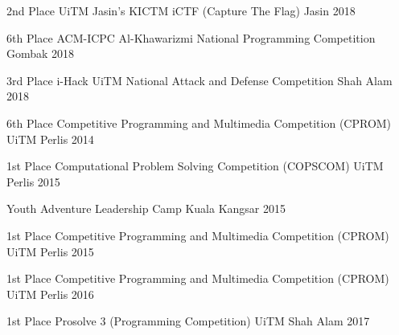\begin{cvhonors}
  \cvhonor
    {2nd Place}
    {UiTM Jasin's KICTM iCTF (Capture The Flag) }
    {Jasin}
    {2018}

  \cvhonor
    {6th Place}
    {ACM-ICPC Al-Khawarizmi National Programming Competition}
    {Gombak}
    {2018}

  \cvhonor
    {3rd Place}
    {i-Hack UiTM National Attack and Defense Competition}
    {Shah Alam}
    {2018}

\end{cvhonors}


\begin{cvhonors}

  \cvhonor
    {6th Place}
    {Competitive Programming and Multimedia Competition (CPROM)}
    {UiTM Perlis}
    {2014}

  \cvhonor
    {1st Place}
    {Computational Problem Solving Competition (COPSCOM)}
    {UiTM Perlis}
    {2015}

  \cvhonor
    {}
    {Youth Adventure Leadership Camp}
    {Kuala Kangsar}
    {2015}

  \cvhonor
    {1st Place}
    {Competitive Programming and Multimedia Competition (CPROM)}
    {UiTM Perlis}
    {2015}
        
  \cvhonor
    {1st Place}
    {Competitive Programming and Multimedia Competition (CPROM)}
    {UiTM Perlis}
    {2016}

  \cvhonor
    {1st Place}
    {Prosolve 3 (Programming Competition)}
    {UiTM Shah Alam}
    {2017}

\end{cvhonors}
